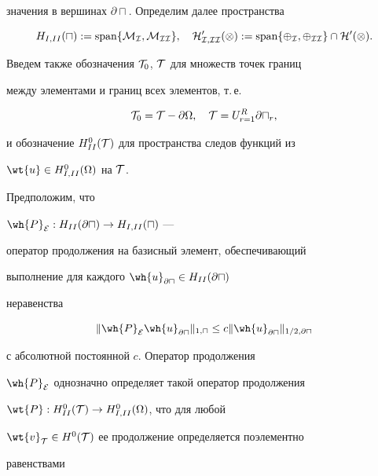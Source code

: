 значения в вершинах $\partial\sqcap$. Определим далее пространства 




$$


H_{I,II}(\sqcap):= \Span \{ \m I,\m {II} \},\quad


H^0_{I,II}(\Omega):= \Span \{\Phi_I,\Phi_{II} \} \cap H^0(\Omega).


$$


Введем также обозначения ${\cal T}_0$, ${\cal T}$ для множеств точек границ 


между элементами и границ всех элементов, т.\,е.


$$


{\cal T}_0 = {\cal T}-\partial\Omega, \quad {\cal T} = U^R_{r=1}


\partial\sqcap_r,


$$


и обозначение $H^0_{II}({\cal T})$ для пространства следов функций из 


$\wt{u} \in H^0_{I,II}(\Omega)$ на ${\cal T}$.





Предположим, что 




$\wh{P}_{\cal {E}}:H_{II}(\partial\sqcap)\to H_{I,II}(\sqcap)$ ---


оператор продолжения на базисный элемент, обеспечивающий 


выполнение для каждого $\wh{u}_{\partial\sqcap} \in H_{II}(\partial\sqcap)$ 


неравенства 


\begin{equation}\label{5.11}


\|\wh{P}_{\cal {E}} \wh{u}_{\partial\sqcap}\|_{1,\sqcap} \leq


c\|\wh{u}_{\partial\sqcap}\|_{1/2, \partial\sqcap}


\end{equation}


с абсолютной постоянной $c$. Оператор продолжения 


$\wh{P}_{\cal {E}}$ однозначно определяет такой оператор продолжения 


$\wt{P}:H^0_{II}({\cal T})\to H^0_{I,II}(\Omega)$, что для любой 


$\wt{v}_{\cal T}\in H^0({\cal T})$ ее продолжение определяется поэлементно 


равенствами


